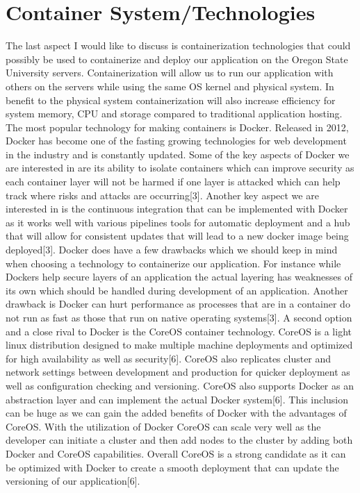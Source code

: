 \documentclass[letterpaper, 10pt, draftclsnofoot,onecolumn]{IEEEtran}
\begin{document}
\section{Container System/Technologies}
The last aspect I would like to discuss is containerization technologies that could possibly be used to containerize and deploy our application on the Oregon State University servers. Containerization will allow us to run our application with others on the servers while using the same OS kernel and physical system. In benefit to the physical system containerization will also increase efficiency for system memory, CPU and storage compared to traditional application hosting. 
The most popular technology for making containers is Docker. Released in 2012, Docker has become one of the fasting growing technologies for web development in the industry and is constantly updated. Some of the key aspects of Docker we are interested in are its ability to isolate containers which can improve security as each container layer will not be harmed if one layer is attacked which can help track where risks and attacks are occurring[3]. Another key aspect we are interested in is the continuous integration that can be implemented with Docker as it works well with various pipelines tools for automatic deployment and a hub that will allow for consistent updates that will lead to a new docker image being deployed[3]. Docker does have a few drawbacks which we should keep in mind when choosing a technology to containerize our application. For instance while Dockers help secure layers of an application the actual layering has weaknesses of its own which should be handled during development of an application. Another drawback is Docker can hurt performance as processes that are in a container do not run as fast as those that run on native operating systems[3]. 
A second option and a close rival to Docker is the CoreOS container technology. CoreOS is a light linux distribution designed to make multiple machine deployments and optimized for high availability as well as security[6]. CoreOS also replicates cluster and network settings between development and production for quicker deployment as well as configuration checking and versioning. CoreOS also supports Docker as an abstraction layer and can implement the actual Docker system[6]. This inclusion can be huge as we can gain the added benefits of Docker with the advantages of CoreOS. With the utilization of Docker CoreOS can scale very well as the developer can initiate a cluster and then add nodes to the cluster by adding both Docker and CoreOS capabilities. Overall CoreOS is a strong candidate as it can be optimized with Docker to create a smooth deployment that can update the versioning of our application[6]. 
\end{document}
